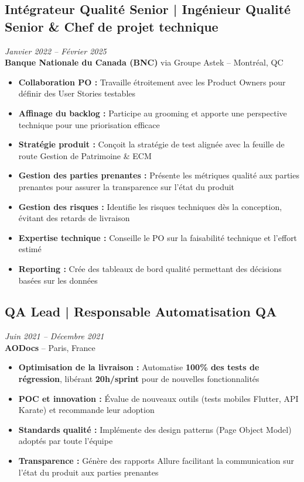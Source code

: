 \documentclass[11pt,a4paper]{article}
\newcommand{\highlight}[1]{\textcolor{primaryblue}{\textbf{#1}}}
\newcommand{\keypoint}[1]{\textbf{#1}}
\begin{document}
\subsection*{Intégrateur Qualité Senior | Ingénieur Qualité Senior \& Chef de projet technique} \hfill \textit{\color{mediumgray}Janvier 2022 -- Février 2025}\\
\textcolor{primaryblue}{\textbf{Banque Nationale du Canada (BNC)}} via Groupe Astek -- Montréal, QC
\begin{itemize}[leftmargin=22pt]
    \item \highlight{Collaboration PO :} Travaille étroitement avec les Product Owners pour définir des User Stories testables
    \item \highlight{Affinage du backlog :} Participe au grooming et apporte une perspective technique pour une priorisation efficace
    \item \highlight{Stratégie produit :} Conçoit la stratégie de test alignée avec la feuille de route Gestion de Patrimoine \& ECM
    \item \highlight{Gestion des parties prenantes :} Présente les métriques qualité aux parties prenantes pour assurer la transparence sur l'état du produit
    \item \highlight{Gestion des risques :} Identifie les risques techniques dès la conception, évitant des retards de livraison
    \item \highlight{Expertise technique :} Conseille le PO sur la faisabilité technique et l'effort estimé
    \item \highlight{Reporting :} Crée des tableaux de bord qualité permettant des décisions basées sur les données
\end{itemize}

\subsection*{QA Lead | Responsable Automatisation QA} \hfill \textit{\color{mediumgray}Juin 2021 -- Décembre 2021}\\
\textcolor{primaryblue}{\textbf{AODocs}} -- Paris, France
\begin{itemize}[leftmargin=22pt]
    \item \highlight{Optimisation de la livraison :} Automatise \keypoint{100\% des tests de régression}, libérant \keypoint{20h/sprint} pour de nouvelles fonctionnalités
    \item \highlight{POC et innovation :} Évalue de nouveaux outils (tests mobiles Flutter, API Karate) et recommande leur adoption
    \item \highlight{Standards qualité :} Implémente des design patterns (Page Object Model) adoptés par toute l'équipe
    \item \highlight{Transparence :} Génère des rapports Allure facilitant la communication sur l'état du produit aux parties prenantes
\end{itemize}
\end{document}
